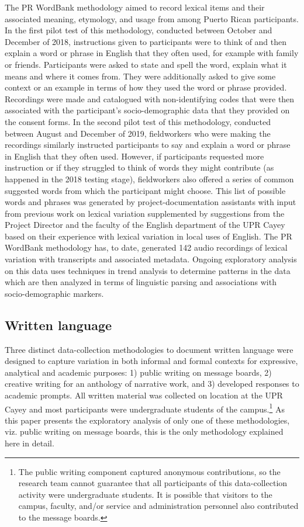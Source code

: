 \documentclass[output=paper,colorlinks,citecolor=brown]{langscibook}
\begin{document}
The PR WordBank methodology aimed to record lexical items and their associated meaning, etymology, and usage from among Puerto Rican participants. In the first pilot test of this methodology, conducted between October and December of 2018, instructions given to participants were to think of and then explain a word or phrase in English that they often used, for example with family or friends. Participants were asked to state and spell the word, explain what it means and where it comes from. They were additionally asked to give some context or an example in terms of how they used the word or phrase provided. Recordings were made and catalogued with non-identifying codes that were then associated with the participant’s socio-demographic data that they provided on the consent forms. In the second pilot test of this methodology, conducted between August and December of 2019, fieldworkers who were making the recordings similarly instructed participants to say and explain a word or phrase in English that they often used. However, if participants requested more instruction or if they struggled to think of words they might contribute (as happened in the 2018 testing stage), fieldworkers also offered a series of common suggested words from which the participant might choose. This list of possible words and phrases was generated by project-documentation assistants with input from previous work on lexical variation \citep{Nash_1971,Nash_1996} supplemented by suggestions from the Project Director and the faculty of the English department of the UPR Cayey based on their experience with lexical variation in local uses of English. The PR WordBank methodology has, to date, generated 142 audio recordings of lexical variation with transcripts and associated metadata. Ongoing exploratory analysis on this data uses techniques in trend analysis to determine patterns in the data which are then analyzed in terms of linguistic parsing and associations with socio-demographic markers.

\subsection{Written language}

Three distinct data-collection methodologies to document written language were designed to capture variation in both informal and formal contexts for expressive, analytical and academic purposes: 1) public writing on message boards, 2) creative writing for an anthology of narrative work, and 3) developed responses to academic prompts. All written material was collected on location at the UPR Cayey and most participants were undergraduate students of the campus.\footnote{The public writing component captured anonymous contributions, so the research team cannot guarantee that all participants of this data-collection activity were undergraduate students. It is possible that visitors to the campus, faculty, and/or service and administration personnel also contributed to the message boards.} As this paper presents the exploratory analysis of only one of these methodologies, viz. public writing on message boards, this is the only methodology explained here in detail.
\end{document}
